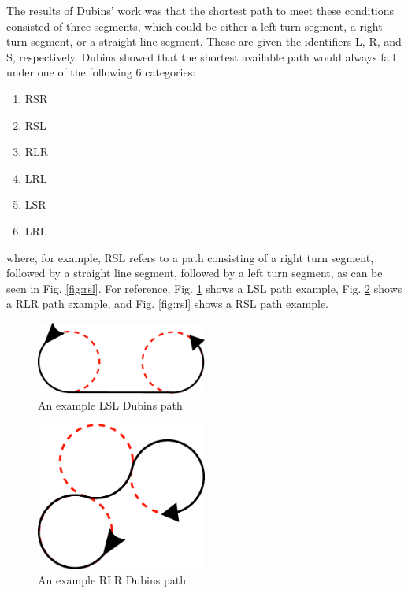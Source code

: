 The results of Dubins' work was that the shortest path to meet these conditions consisted of three segments, which could be either a left turn segment, a right turn segment, or a straight line segment. These are given the identifiers L, R, and S, respectively. Dubins showed that the shortest available path would always fall under one of the following 6 categories:
\begin{enumerate}
	\item RSR
	\item RSL
	\item RLR
	\item LRL
	\item LSR
	\item LRL
\end{enumerate}

where, for example, RSL refers to a path consisting of a right turn segment, followed by a straight line segment, followed by a left turn segment, as can be seen in Fig. \ref{fig:rsl}. For reference, Fig. \ref{fig:lsl} shows a LSL path example, Fig. \ref{fig:rlr} shows a RLR path example, and Fig. \ref{fig:rsl} shows a RSL path example. 

\begin{figure}[htbp!] 
\centering    
\includegraphics[width=0.5\textwidth]{LSL}
\caption[Dubins LSL Path]{An example LSL Dubins path}
\label{fig:lsl}
\end{figure}

\begin{figure}[htbp!] 
\centering    
\includegraphics[width=0.5\textwidth]{RLR}
\caption[Dubins RLR Path]{An example RLR Dubins path}
\label{fig:rlr}
\end{figure}

